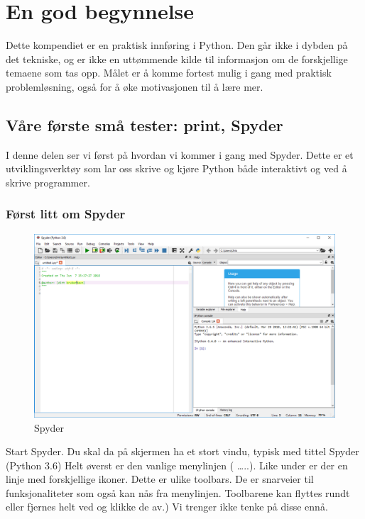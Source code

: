 \chapter{En god begynnelse}
Dette kompendiet er en praktisk innføring i Python. Den går ikke i dybden på det tekniske, og er ikke en uttømmende kilde til informasjon om de forskjellige temaene som tas opp. Målet er å komme fortest mulig i gang med praktisk problemløsning, også for å øke motivasjonen til å lære mer.

\section{Våre første små tester: print, Spyder}

I denne delen ser vi først på hvordan vi kommer i gang med Spyder. Dette er et utviklingsverktøy som lar oss skrive og kjøre Python både interaktivt og ved å skrive programmer. 

\subsection*{Først litt om Spyder}
\begin{figure}[h]
\begin{center}
\includegraphics[width=1.0\textwidth]{img/spyder_overview.png}
\end{center}
\caption{Spyder}
\label{fig:spyder_overview}
\end{figure}

Start Spyder. Du skal da på skjermen ha et stort vindu, typisk med tittel Spyder (Python 3.6) Helt øverst er den vanlige menylinjen (    \ldots..). Like under er der en linje med forskjellige ikoner. Dette er ulike toolbars. De er snarveier til funksjonaliteter som også kan nås fra menylinjen. Toolbarene kan flyttes rundt eller fjernes helt ved   og klikke de av.) Vi trenger ikke tenke på disse ennå. 


